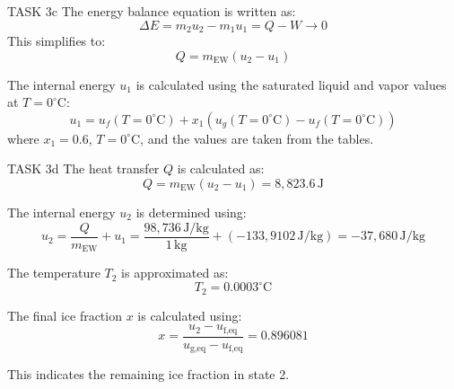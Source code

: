 TASK 3c  
The energy balance equation is written as:  
\[
\Delta E = m_2 u_2 - m_1 u_1 = Q - W \rightarrow 0
\]  
This simplifies to:  
\[
Q = m_{\text{EW}} (u_2 - u_1)
\]  

The internal energy \( u_1 \) is calculated using the saturated liquid and vapor values at \( T = 0^\circ\text{C} \):  
\[
u_1 = u_f(T = 0^\circ\text{C}) + x_1 (u_g(T = 0^\circ\text{C}) - u_f(T = 0^\circ\text{C}))
\]  
where \( x_1 = 0.6 \), \( T = 0^\circ\text{C} \), and the values are taken from the tables.  

TASK 3d  
The heat transfer \( Q \) is calculated as:  
\[
Q = m_{\text{EW}} (u_2 - u_1) = 8,823.6 \, \text{J}
\]  

The internal energy \( u_2 \) is determined using:  
\[
u_2 = \frac{Q}{m_{\text{EW}}} + u_1 = \frac{98,736 \, \text{J/kg}}{1 \, \text{kg}} + (-133,9102 \, \text{J/kg}) = -37,680 \, \text{J/kg}
\]  

The temperature \( T_2 \) is approximated as:  
\[
T_2 = 0.0003^\circ\text{C}
\]  

The final ice fraction \( x \) is calculated using:  
\[
x = \frac{u_2 - u_{\text{f,eq}}}{u_{\text{g,eq}} - u_{\text{f,eq}}} = 0.896081
\]  

This indicates the remaining ice fraction in state 2.